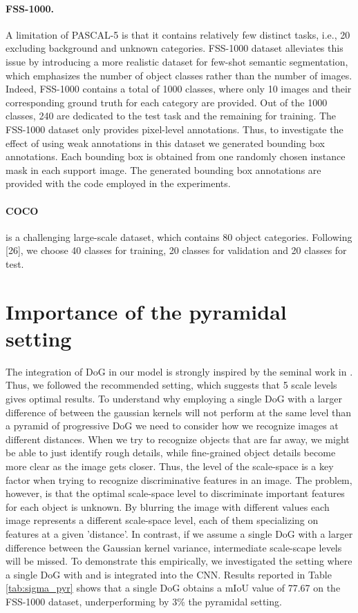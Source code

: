 \documentclass[runningheads]{llncs}
\begin{document}
\paragraph{\textbf{FSS-1000}.} A limitation of PASCAL-5 is that it contains relatively few distinct tasks, i.e., 20 excluding background and unknown categories. FSS-1000 dataset \cite{wei2019fss} alleviates this issue by introducing a more realistic dataset for few-shot semantic segmentation, which emphasizes the number of object classes rather than the number of images. Indeed, FSS-1000 contains a total of 1000 classes, where only 10 images and their corresponding ground truth for each category are provided. Out of the 1000 classes, 240 are dedicated to the test task and the remaining for training. The FSS-1000 dataset \cite{wei2019fss} only provides pixel-level annotations. Thus, to investigate the effect of using weak annotations in this dataset we generated bounding box annotations. Each bounding box is obtained from one randomly chosen instance mask in each support image. The generated bounding box annotations are provided with the code employed in the experiments.  

\paragraph{\textbf{COCO}} is a challenging large-scale dataset, which contains 80 object categories. Following [26], we choose 40 classes for training, 20 classes for validation and 20 classes for test. 

\section{Importance of the pyramidal setting}

The integration of DoG in our model is strongly inspired by the seminal work in \cite{lowe2004distinctive}. Thus, we followed the recommended setting, which suggests that 5 scale levels gives optimal results. To understand why employing a single DoG with a larger difference of  between the gaussian kernels will not perform at the same level than a pyramid of progressive DoG we need to consider how we recognize images at different distances. When we try to recognize objects that are far away, we might be able to just identify rough details, while fine-grained object details become more clear as the image gets closer. Thus, the level of the scale-space is a key factor when trying to recognize discriminative features in an image. The problem, however, is that the optimal scale-space level to discriminate important features for each object is unknown. By blurring the image with different  values each image represents a different scale-space level, each of them specializing on features at a given 'distance'. In contrast, if we assume a single DoG with a larger difference between the Gaussian kernel variance, intermediate scale-scape levels will be missed. To demonstrate this empirically, we investigated the setting where a single DoG with  and  is integrated into the CNN. Results reported in Table \ref{tab:sigma_pyr} shows that a single DoG obtains a mIoU value of 77.67 on the FSS-1000 dataset, underperforming by 3\% the pyramidal setting. 
\end{document}

